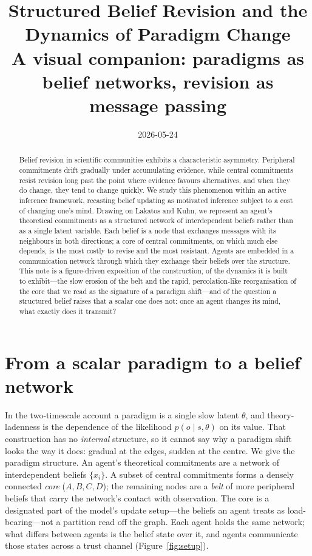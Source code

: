 \documentclass[11pt,a4paper]{article}
\title{\vspace{-2.5em}Structured Belief Revision and the Dynamics of
Paradigm Change\\[3pt]
\large A visual companion: paradigms as belief networks,
revision as message passing}
\author{}
\date{2026-05-24}
\begin{document}
\maketitle
\vspace{-2em}

\begin{abstract}
\noindent
Belief revision in scientific communities exhibits a characteristic asymmetry.
Peripheral commitments drift gradually under accumulating evidence, while
central commitments resist revision long past the point where evidence favours
alternatives, and when they do change, they tend to change quickly. We study
this phenomenon within an active inference framework, recasting belief updating
as motivated inference subject to a cost of changing one's mind. Drawing on
Lakatos and Kuhn, we represent an agent's theoretical commitments as a
structured network of interdependent beliefs rather than as a single latent
variable. Each belief is a node that exchanges messages with its neighbours in
both directions; a core of central commitments, on which much else depends, is
the most costly to revise and the most resistant. Agents are embedded in a
communication network through which they exchange their beliefs over the
structure. This note is a figure-driven exposition of the construction, of the
dynamics it is built to exhibit---the slow erosion of the belt and the rapid,
percolation-like reorganisation of the core that we read as the signature of a
paradigm shift---and of the question a structured belief raises that a scalar
one does not: once an agent changes its mind, what exactly does it transmit?
\end{abstract}

\section{From a scalar paradigm to a belief network}

In the two-timescale account a paradigm is a single slow latent $\theta$, and
theory-ladenness is the dependence of the likelihood $p(o\mid s,\theta)$ on its
value. That construction has no \emph{internal} structure, so it cannot say why
a paradigm shift looks the way it does: gradual at the edges, sudden at the
centre. We give the paradigm structure. An agent's theoretical commitments are
a network of interdependent beliefs $\{x_i\}$. A subset of central commitments
forms a densely connected \emph{core} ($A,B,C,D$); the remaining nodes are a
\emph{belt} of more peripheral beliefs that carry the network's contact with
observation. The core is a designated part of the model's update setup---the
beliefs an agent treats as load-bearing---not a partition read off the graph.
Each agent holds the same network; what differs between agents is the belief
state over it, and agents communicate those states across a trust channel
(Figure~\ref{fig:setup}).
\end{document}
